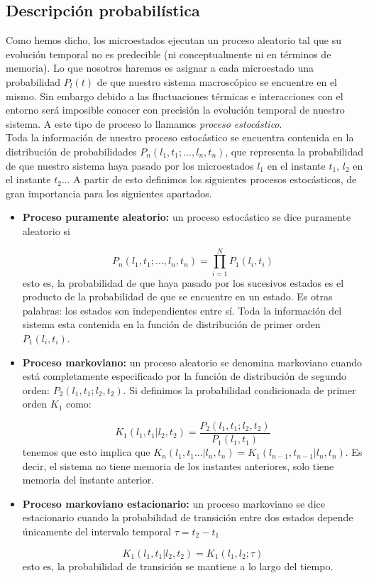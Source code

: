 \documentclass[12pt,a4paper]{article}
\numberwithin{equation}{section}
\numberwithin{figure}{section}
\theoremstyle{definition}
\begin{document}
\subsection{Descripción probabilística}

Como hemos dicho, los microestados ejecutan un proceso aleatorio tal que su evolución temporal no es predecible (ni conceptualmente ni en términos de memoria). Lo que nosotros haremos es asignar a cada microestado una probabilidad $P_l(t)$ de que nuestro sistema macroscópico se encuentre en el mismo. Sin embargo debido a las fluctuaciones térmicas e interacciones con el entorno será imposible conocer con precisión la evolución temporal de nuestro sistema. A este tipo de proceso lo llamamos \textit{proceso estocástico}. \\

Toda la información de nuestro proceso estocástico se encuentra contenida en la distribución de probabilidades  $P_n(l_1,t_1;...,l_n,t_n)$, que representa la probabilidad de que nuestro sistema haya pasado por los microestados $l_1$ en el instante $t_1$, $l_2$ en el instante $t_2$... A partir de esto definimos los siguientes procesos estocásticos, de gran importancia para los siguientes apartados. \\

\begin{itemize}
\item \textbf{Proceso puramente aleatorio:} un proceso estocástico se dice puramente aleatorio si 

\begin{equation}
P_n(l_1,t_1;...,l_n,t_n) = \prod_{i=1}^N P_1 (l_i,t_i)
\end{equation}
esto es, la probabilidad de que haya pasado por los sucesivos estados es el producto de la probabilidad de que se encuentre en un estado. Es otras palabras: los estados son independientes entre sí. Toda la información del sistema esta contenida en la función de distribución de primer orden $P_1 (l_i,t_i)$. 

\item \textbf{Proceso markoviano:} un proceso aleatorio se denomina markoviano cuando está completamente especificado por la función de distribución de segundo orden: $P_2 (l_1,t_1;l_2,t_2)$. Si definimos la probabilidad condicionada de primer orden $K_1$ como:

\begin{equation}
K_1(l_1,t_1 | l_2,t_2) = \dfrac{P_2 (l_1,t_1;l_2,t_2)}{P_1(l_1,t_1)}
\end{equation}
tenemos que esto implica que $K_n(l_1,t_1...|l_n,t_n)=K_1(l_{n-1},t_{n-1}|l_n,t_n)$. Es decir, el sistema no tiene memoria de los instantes anteriores, solo tiene memoria del instante anterior. 

\item \textbf{Proceso markoviano estacionario:} un proceso markoviano se dice estacionario cuando la probabilidad de transición entre dos estados depende únicamente del intervalo temporal $\tau=t_2-t_1$

$$ K_1(l_1,t_1|l_2,t_2) = K_1(l_1,l_2;\tau)$$
esto es, la probabilidad de transición se mantiene a lo largo del tiempo. 
\end{itemize}
\end{document}
